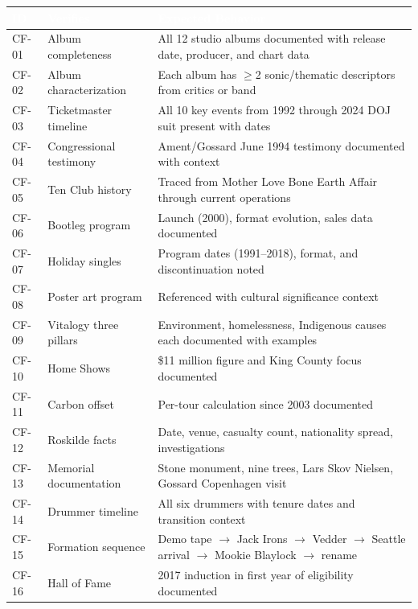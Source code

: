 \documentclass[11pt,letterpaper]{article}
\newcommand{\tableheader}[1]{\textbf{\sffamily\textcolor{white}{#1}}}
\begin{document}
\begin{center}
\begin{tabularx}{\textwidth}{C{1.2cm}L{3.5cm}X}
\toprule
{}
\tableheader{ID} & \tableheader{Verifies} & \tableheader{Expected Behavior} \\
\midrule
CF-01 & Album completeness & All 12 studio albums documented with release date, producer, and chart data \\
CF-02 & Album characterization & Each album has $\geq$2 sonic/thematic descriptors from critics or band \\
CF-03 & Ticketmaster timeline & All 10 key events from 1992 through 2024 DOJ suit present with dates \\
CF-04 & Congressional testimony & Ament/Gossard June 1994 testimony documented with context \\
CF-05 & Ten Club history & Traced from Mother Love Bone Earth Affair through current operations \\
CF-06 & Bootleg program & Launch (2000), format evolution, sales data documented \\
CF-07 & Holiday singles & Program dates (1991--2018), format, and discontinuation noted \\
CF-08 & Poster art program & Referenced with cultural significance context \\
CF-09 & Vitalogy three pillars & Environment, homelessness, Indigenous causes each documented with examples \\
CF-10 & Home Shows & \$11 million figure and King County focus documented \\
CF-11 & Carbon offset & Per-tour calculation since 2003 documented \\
CF-12 & Roskilde facts & Date, venue, casualty count, nationality spread, investigations \\
CF-13 & Memorial documentation & Stone monument, nine trees, Lars Skov Nielsen, Gossard Copenhagen visit \\
CF-14 & Drummer timeline & All six drummers with tenure dates and transition context \\
CF-15 & Formation sequence & Demo tape $\rightarrow$ Jack Irons $\rightarrow$ Vedder $\rightarrow$ Seattle arrival $\rightarrow$ Mookie Blaylock $\rightarrow$ rename \\
CF-16 & Hall of Fame & 2017 induction in first year of eligibility documented \\
\bottomrule
\end{tabularx}
\end{center}
\end{document}

